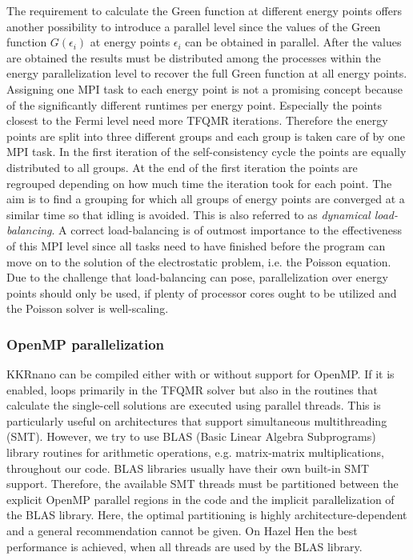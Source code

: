 \documentclass[graybox]{svmult}
\begin{document}
The requirement to calculate the Green function at different energy points offers another possibility to
introduce a parallel level since the values of the Green function $G(\epsilon_i)$ at energy points $\epsilon_i$
can be obtained in parallel.
After the values are obtained the results must be distributed among the processes within
the energy parallelization level to recover the full Green function at all energy points.
Assigning one MPI task to each energy point is not a promising concept because
of the significantly different runtimes per energy point. Especially the points closest to the
Fermi level 
need more TFQMR iterations.
Therefore the energy points are split into three different groups and each group is taken care of by
one MPI task.
In the first iteration of the self-consistency cycle the points are equally distributed to all
groups. At the end of the first iteration the points are regrouped depending on how much time the iteration took
for each point. The aim is to find a grouping for which all groups of energy points are converged at
a similar time so that idling is avoided. This is also referred to as \textit{dynamical load-balancing}.
A correct load-balancing is of outmost importance to the effectiveness of this MPI level since
all tasks need to have finished before the program can move on to the solution of the electrostatic problem,
i.e. the Poisson equation.
Due to the challenge that load-balancing can pose, parallelization over energy points should only be used, 
if plenty of processor cores
ought to be utilized and the Poisson solver is well-scaling.

\subsubsection*{OpenMP parallelization}

KKRnano can be compiled either with or without support for OpenMP.
If it is enabled,
loops primarily in the TFQMR solver but also in the routines that calculate the single-cell
solutions are executed using parallel threads. 
This is particularly useful on architectures that support simultaneous multithreading (SMT).
However, we try to use BLAS (Basic Linear Algebra Subprograms) library routines for arithmetic
operations, e.g. matrix-matrix multiplications, throughout our code. BLAS libraries usually
have their own built-in SMT support.
Therefore, the available SMT threads must be partitioned between the explicit OpenMP 
parallel regions in the code and the implicit parallelization of the BLAS library.
Here, the optimal partitioning is highly architecture-dependent and a general recommendation cannot
be given. On Hazel Hen the best performance is achieved, when all threads are used by the BLAS library.
\end{document}
